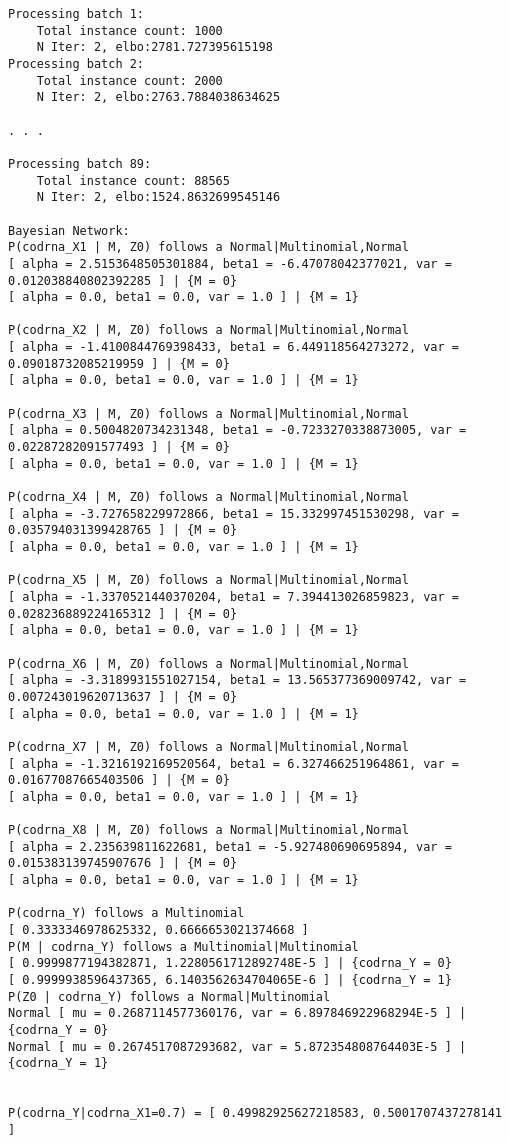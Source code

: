 \documentclass[10pt,a4paper]{report}
\begin{document}
\begin{verbatim}
Processing batch 1:
    Total instance count: 1000
    N Iter: 2, elbo:2781.727395615198
Processing batch 2:
    Total instance count: 2000
    N Iter: 2, elbo:2763.7884038634625

. . .

Processing batch 89:
    Total instance count: 88565
    N Iter: 2, elbo:1524.8632699545146
	
Bayesian Network:
P(codrna_X1 | M, Z0) follows a Normal|Multinomial,Normal
[ alpha = 2.5153648505301884, beta1 = -6.47078042377021, var = 0.012038840802392285 ] | {M = 0}
[ alpha = 0.0, beta1 = 0.0, var = 1.0 ] | {M = 1}

P(codrna_X2 | M, Z0) follows a Normal|Multinomial,Normal
[ alpha = -1.4100844769398433, beta1 = 6.449118564273272, var = 0.09018732085219959 ] | {M = 0}
[ alpha = 0.0, beta1 = 0.0, var = 1.0 ] | {M = 1}

P(codrna_X3 | M, Z0) follows a Normal|Multinomial,Normal
[ alpha = 0.5004820734231348, beta1 = -0.7233270338873005, var = 0.02287282091577493 ] | {M = 0}
[ alpha = 0.0, beta1 = 0.0, var = 1.0 ] | {M = 1}

P(codrna_X4 | M, Z0) follows a Normal|Multinomial,Normal
[ alpha = -3.727658229972866, beta1 = 15.332997451530298, var = 0.035794031399428765 ] | {M = 0}
[ alpha = 0.0, beta1 = 0.0, var = 1.0 ] | {M = 1}

P(codrna_X5 | M, Z0) follows a Normal|Multinomial,Normal
[ alpha = -1.3370521440370204, beta1 = 7.394413026859823, var = 0.028236889224165312 ] | {M = 0}
[ alpha = 0.0, beta1 = 0.0, var = 1.0 ] | {M = 1}

P(codrna_X6 | M, Z0) follows a Normal|Multinomial,Normal
[ alpha = -3.3189931551027154, beta1 = 13.565377369009742, var = 0.007243019620713637 ] | {M = 0}
[ alpha = 0.0, beta1 = 0.0, var = 1.0 ] | {M = 1}

P(codrna_X7 | M, Z0) follows a Normal|Multinomial,Normal
[ alpha = -1.3216192169520564, beta1 = 6.327466251964861, var = 0.01677087665403506 ] | {M = 0}
[ alpha = 0.0, beta1 = 0.0, var = 1.0 ] | {M = 1}

P(codrna_X8 | M, Z0) follows a Normal|Multinomial,Normal
[ alpha = 2.235639811622681, beta1 = -5.927480690695894, var = 0.015383139745907676 ] | {M = 0}
[ alpha = 0.0, beta1 = 0.0, var = 1.0 ] | {M = 1}

P(codrna_Y) follows a Multinomial
[ 0.3333346978625332, 0.6666653021374668 ]
P(M | codrna_Y) follows a Multinomial|Multinomial
[ 0.9999877194382871, 1.2280561712892748E-5 ] | {codrna_Y = 0}
[ 0.9999938596437365, 6.1403562634704065E-6 ] | {codrna_Y = 1}
P(Z0 | codrna_Y) follows a Normal|Multinomial
Normal [ mu = 0.2687114577360176, var = 6.897846922968294E-5 ] | {codrna_Y = 0}
Normal [ mu = 0.2674517087293682, var = 5.872354808764403E-5 ] | {codrna_Y = 1}


P(codrna_Y|codrna_X1=0.7) = [ 0.49982925627218583, 0.5001707437278141 ]



\end{verbatim}
\end{document}
